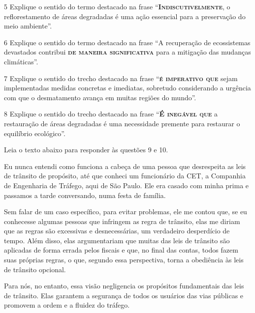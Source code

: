 \num{5} Explique o sentido do termo destacado na frase ``\textsc{\textbf{Indiscutivelmente}}, o
reflorestamento de áreas degradadas é uma ação essencial para a preservação do
meio ambiente''.

\num{6} Explique o sentido do termo destacado na frase ``A recuperação de
ecossistemas devastados contribui \textsc{\textbf{de maneira significativa}} para a mitigação das
mudanças climáticas''.

\num{7} Explique o sentido do trecho destacado na frase ``\textsc{\textbf{é imperativo que}} sejam 
implementadas medidas concretas e imediatas, sobretudo considerando a urgência com que o
desmatamento avança em muitas regiões do mundo''.

\num{8} Explique o sentido do trecho destacado na frase ``\textsc{\textbf{É
inegável que}} a restauração de áreas degradadas é uma necessidade premente
para restaurar o equilíbrio ecológico''.

Leia o texto abaixo para responder às questões 9 e 10.

\begin{myquote}

Eu nunca entendi como funciona a cabeça de uma pessoa que desrespeita as leis
de trânsito de propósito, até que conheci um funcionário da CET, a Companhia
de Engenharia de Tráfego, aqui de São Paulo. Ele era casado com minha prima e
passamos a tarde conversando, numa festa de família. 

Sem falar de um caso específico, para evitar problemas, ele me contou que, se
eu conhecesse algumas pessoas que infringem as regra de trânsito,
elas me diriam que as regras são excessivas e desnecessárias, um
verdadeiro desperdício de tempo. Além disso, elas argumentariam que muitas das
leis de trânsito são aplicadas de forma errada pelos fiscais e que, no final
das contas, todos fazem suas próprias regras, o que, segundo essa perspectiva,
torna a obediência às leis de trânsito opcional.

Para nós, no entanto, essa visão negligencia os propósitos fundamentais das leis 
de trânsito. Elas garantem a segurança de todos os usuários das vias públicas e 
promovem a ordem e a fluidez do tráfego.


\end{myquote}

